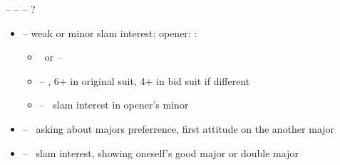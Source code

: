  --  --  -- ?
\begin{itemize}
  \item {} -- weak or minor slam interest; opener: :
  \begin{itemize}
    \item \pass\ or  -- \so
    \item {} -- \gf, 6+ in original suit, 4+ in bid suit if different
    \item {} -- \force\ slam interest in opener's minor
  \end{itemize}
  \item {} -- \gf\ asking about majors preferrence, first attitude on the another major
  \item {} -- \gf\ slam interest, showing oneself's good major or double major
\end{itemize}

